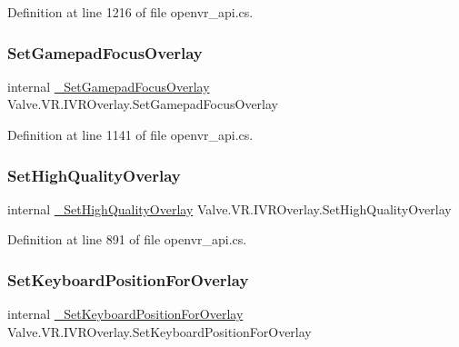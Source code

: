 Definition at line 1216 of file openvr\+\_\+api.\+cs.

\mbox{\label{struct_valve_1_1_v_r_1_1_i_v_r_overlay_a5a9d5b199a8812253ca3ab2b47e0ac3c}} 
\subsubsection{\texorpdfstring{SetGamepadFocusOverlay}{SetGamepadFocusOverlay}}
{\footnotesize\ttfamily internal \mbox{\hyperlink{struct_valve_1_1_v_r_1_1_i_v_r_overlay_a52e2a2a1d78d2bc21361fee22beb6b65}{\+\_\+\+Set\+Gamepad\+Focus\+Overlay}} Valve.\+V\+R.\+I\+V\+R\+Overlay.\+Set\+Gamepad\+Focus\+Overlay}



Definition at line 1141 of file openvr\+\_\+api.\+cs.

\mbox{\label{struct_valve_1_1_v_r_1_1_i_v_r_overlay_acd9849da5dfb83e83c64d54544bd07dd}} 
\subsubsection{\texorpdfstring{SetHighQualityOverlay}{SetHighQualityOverlay}}
{\footnotesize\ttfamily internal \mbox{\hyperlink{struct_valve_1_1_v_r_1_1_i_v_r_overlay_a659761a1e6723ccc46ed137f72a2421e}{\+\_\+\+Set\+High\+Quality\+Overlay}} Valve.\+V\+R.\+I\+V\+R\+Overlay.\+Set\+High\+Quality\+Overlay}



Definition at line 891 of file openvr\+\_\+api.\+cs.

\mbox{\label{struct_valve_1_1_v_r_1_1_i_v_r_overlay_a6df0e4e19dbfc4e1aae3870d7cd3e8f8}} 
\subsubsection{\texorpdfstring{SetKeyboardPositionForOverlay}{SetKeyboardPositionForOverlay}}
{\footnotesize\ttfamily internal \mbox{\hyperlink{struct_valve_1_1_v_r_1_1_i_v_r_overlay_a2caf87222d0045e8ad341e4ede54a985}{\+\_\+\+Set\+Keyboard\+Position\+For\+Overlay}} Valve.\+V\+R.\+I\+V\+R\+Overlay.\+Set\+Keyboard\+Position\+For\+Overlay}




